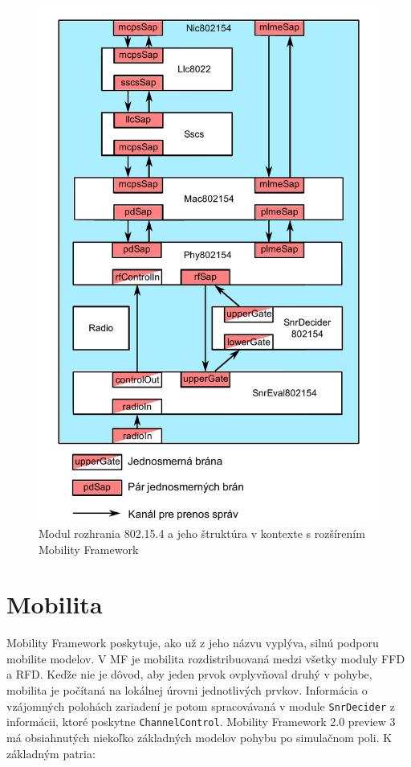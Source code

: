 \begin{figure}[htbp]
\begin{center}
\includegraphics[width=120mm]{figures/architecture_nic}
\caption{Modul rozhrania 802.15.4 a jeho štruktúra v kontexte s rozšírením Mobility Framework}
\label{fig:architecture_nic}
\end{center}
\end{figure}

\section{Mobilita}
\indent\indent Mobility Framework poskytuje, ako už z jeho názvu vyplýva, silnú podporu mobilite modelov. V MF je mobilita rozdistribuovaná medzi všetky moduly FFD a RFD. Keďže nie je dôvod, aby jeden prvok ovplyvňoval druhý v pohybe, mobilita je počítaná na lokálnej úrovni jednotlivých prvkov. Informácia o vzájomných polohách zariadení je potom spracovávaná v module \texttt{SnrDecider} z informácii, ktoré poskytne \texttt{ChannelControl}. Mobility Framework 2.0 preview 3 má obsiahnutých niekoľko základných modelov pohybu po simulačnom poli. K základným patria:\\
